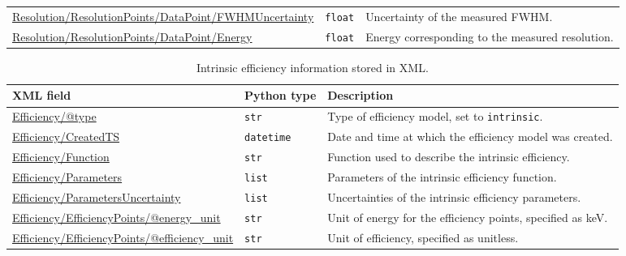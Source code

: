 \begin{table}[H]
\begin{tabular}{>{\raggedright\arraybackslash}p{}
                    >{\raggedright\arraybackslash}p{}
                    >{\raggedright\arraybackslash}p{}}
    \url{Resolution/ResolutionPoints/DataPoint/FWHMUncertainty}
        & \texttt{float}
        & Uncertainty of the measured FWHM. \\

    \url{Resolution/ResolutionPoints/DataPoint/Energy}
        & \texttt{float}
        & Energy corresponding to the measured resolution. \\

    \bottomrule
    \end{tabular}
\end{table}

\begin{table}[H]
    \centering
    \caption{Intrinsic efficiency information stored in XML.}
    \label{tab:instrument-efficiency-xml}
    \begin{tabular}{>{\raggedright\arraybackslash}p{}
                    >{\raggedright\arraybackslash}p{}
                    >{\raggedright\arraybackslash}p{}}
    \toprule
    \textbf{XML field} & \textbf{Python type} & \textbf{Description} \\ \midrule

    \url{Efficiency/@type}
        & \texttt{str}
        & Type of efficiency model, set to \texttt{intrinsic}. \\

    \url{Efficiency/CreatedTS}
        & \texttt{datetime}
        & Date and time at which the efficiency model was created. \\

    \url{Efficiency/Function}
        & \texttt{str}
        & Function used to describe the intrinsic efficiency. \\

    \url{Efficiency/Parameters}
        & \texttt{list}
        & Parameters of the intrinsic efficiency function. \\

    \url{Efficiency/ParametersUncertainty}
        & \texttt{list}
        & Uncertainties of the intrinsic efficiency parameters. \\

    \url{Efficiency/EfficiencyPoints/@energy_unit}
        & \texttt{str}
        & Unit of energy for the efficiency points, specified as keV. \\

    \url{Efficiency/EfficiencyPoints/@efficiency_unit}
        & \texttt{str}
        & Unit of efficiency, specified as unitless. \\


\end{tabular}
\end{table}
